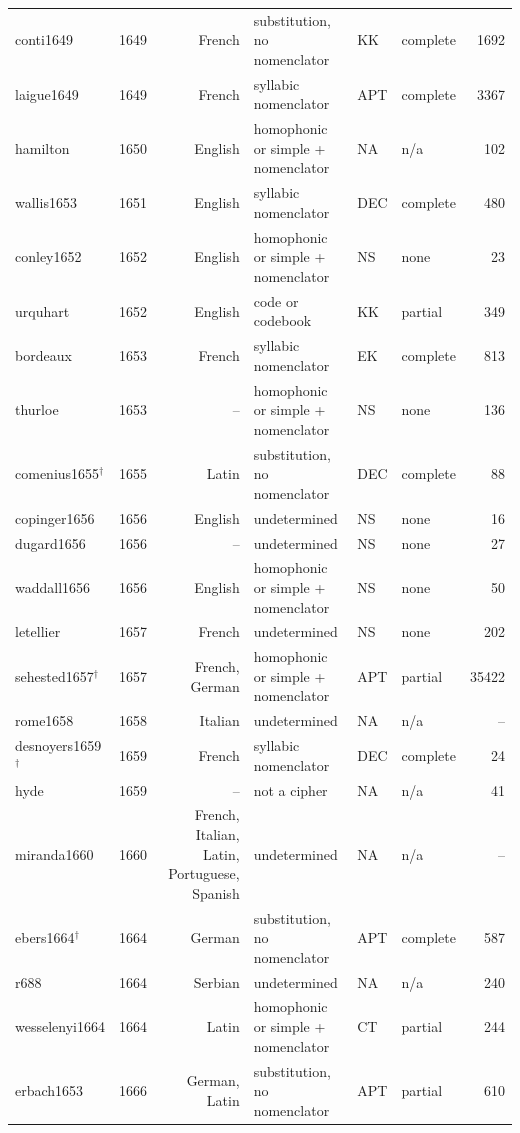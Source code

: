 {\begin{longtable}{@{}llrlllr@{}}
conti1649 & 1649 & French & substitution, no nomenclator & KK & complete & 1692 \\
laigue1649 & 1649 & French & syllabic nomenclator & APT & complete & 3367 \\
hamilton & 1650 & English & homophonic or simple + nomenclator & NA & n/a & 102 \\
wallis1653 & 1651 & English & syllabic nomenclator & DEC & complete & 480 \\
conley1652 & 1652 & English & homophonic or simple + nomenclator & NS & none & 23 \\
urquhart & 1652 & English & code or codebook & KK & partial & 349 \\
bordeaux & 1653 & French & syllabic nomenclator & EK & complete & 813 \\
thurloe & 1653 & -- & homophonic or simple + nomenclator & NS & none & 136 \\
comenius1655$^\dagger$ & 1655 & Latin & substitution, no nomenclator & DEC & complete & 88 \\
copinger1656 & 1656 & English & undetermined & NS & none & 16 \\
dugard1656 & 1656 & -- & undetermined & NS & none & 27 \\
waddall1656 & 1656 & English & homophonic or simple + nomenclator & NS & none & 50 \\
letellier & 1657 & French & undetermined & NS & none & 202 \\
sehested1657$^\dagger$ & 1657 & French, German & homophonic or simple + nomenclator & APT & partial & 35422 \\
rome1658 & 1658 & Italian & undetermined & NA & n/a & -- \\
desnoyers1659$^\dagger$ & 1659 & French & syllabic nomenclator & DEC & complete & 24 \\
hyde & 1659 & -- & not a cipher & NA & n/a & 41 \\
miranda1660 & 1660 & French, Italian, Latin, Portuguese, Spanish & undetermined & NA & n/a & -- \\
ebers1664$^\dagger$ & 1664 & German & substitution, no nomenclator & APT & complete & 587 \\
r688 & 1664 & Serbian & undetermined & NA & n/a & 240 \\
wesselenyi1664 & 1664 & Latin & homophonic or simple + nomenclator & CT & partial & 244 \\
erbach1653 & 1666 & German, Latin & substitution, no nomenclator & APT & partial & 610 \\

\end{longtable}}
